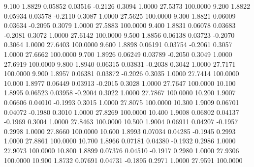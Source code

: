    9.100   1.8829   0.05852   0.03516  -0.2126   0.3094   1.0000  27.5373 100.0000
   9.200   1.8822   0.05934   0.03578  -0.2110   0.3087   1.0000  27.5625 100.0000
   9.300   1.8821   0.06009   0.03634  -0.2095   0.3079   1.0000  27.5883 100.0000
   9.400   1.8831   0.06078   0.03683  -0.2081   0.3072   1.0000  27.6142 100.0000
   9.500   1.8856   0.06138   0.03723  -0.2070   0.3064   1.0000  27.6403 100.0000
   9.600   1.8898   0.06191   0.03754  -0.2061   0.3057   1.0000  27.6662 100.0000
   9.700   1.8926   0.06249   0.03789  -0.2050   0.3049   1.0000  27.6919 100.0000
   9.800   1.8940   0.06315   0.03831  -0.2038   0.3042   1.0000  27.7171 100.0000
   9.900   1.8957   0.06381   0.03872  -0.2026   0.3035   1.0000  27.7414 100.0000
  10.000   1.8977   0.06449   0.03913  -0.2015   0.3028   1.0000  27.7647 100.0000
  10.100   1.8995   0.06523   0.03958  -0.2004   0.3022   1.0000  27.7867 100.0000
  10.200   1.9007   0.06606   0.04010  -0.1993   0.3015   1.0000  27.8075 100.0000
  10.300   1.9009   0.06701   0.04072  -0.1980   0.3010   1.0000  27.8269 100.0000
  10.400   1.9008   0.06802   0.04137  -0.1969   0.3004   1.0000  27.8463 100.0000
  10.500   1.9004   0.06911   0.04207  -0.1957   0.2998   1.0000  27.8660 100.0000
  10.600   1.8993   0.07034   0.04285  -0.1945   0.2993   1.0000  27.8861 100.0000
  10.700   1.8966   0.07181   0.04380  -0.1932   0.2986   1.0000  27.9073 100.0000
  10.800   1.8899   0.07376   0.04510  -0.1917   0.2980   1.0000  27.9306 100.0000
  10.900   1.8732   0.07691   0.04731  -0.1895   0.2971   1.0000  27.9591 100.0000
